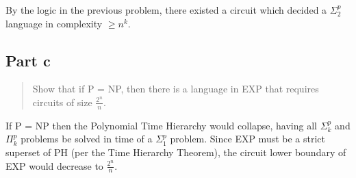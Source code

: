 \documentclass{article}
\begin{document}
By the logic in the previous problem, there existed a circuit which decided a $\Sigma_2^p$ language in complexity $\geq n^k$.

\subsection{Part c}
\begin{quote}
Show that if P = NP, then there is a language in EXP that requires circuits of size $\frac{2^n}n$.
\end{quote}

If P = NP then the Polynomial Time Hierarchy would collapse, having all $\Sigma_k^p$ and $\Pi_k^p$ problems be solved in time of a $\Sigma_1^p$ problem.  Since EXP must be a strict superset of PH (per the Time Hierarchy Theorem), the circuit lower boundary of EXP would decrease to $\frac{2^n}n$.
\end{document}

